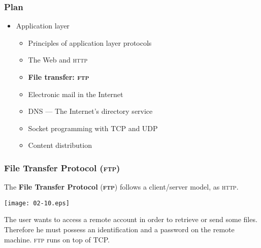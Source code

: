 
%
\begin{frame}
\frametitle{Plan}

\begin{itemize}

  \item Application layer

  \begin{itemize}

    \item Principles of application layer protocols

    \item The Web and \textsc{http}

    \item \textbf{File transfer: \textsc{ftp}}

    \item Electronic mail in the Internet

    \item DNS --- The Internet's directory service

    \item Socket programming with TCP and UDP

    \item Content distribution

  \end{itemize}

\end{itemize}

\end{frame}

%
\begin{frame}
\frametitle{File Transfer Protocol (\textsc{ftp})}

The \textbf{File Transfer Protocol} (\textbf{\textsc{ftp}}) follows a
client/server model, as \textsc{http}.
\begin{center}
\texttt{[image: 02-10.eps]}
\end{center}
The user wants to access a remote account in order to retrieve or send
some files. Therefore he must possess an identification and a password
on the remote machine. \textsc{ftp} runs on top of TCP.

\end{frame}

